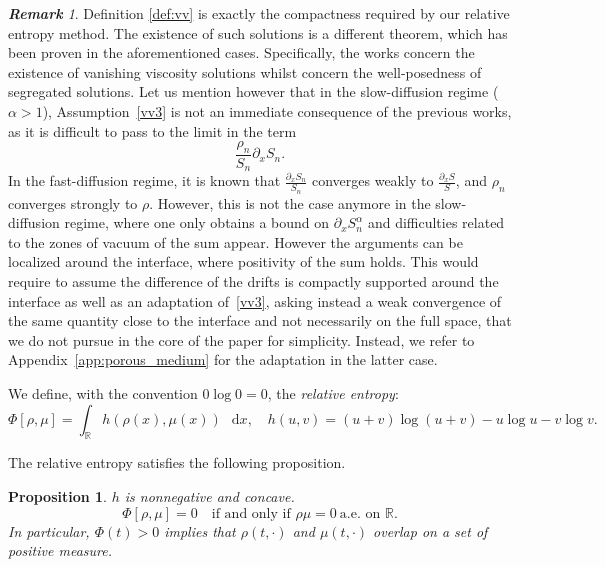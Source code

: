 \documentclass[a4paper,twosided, 11pt]{article}
\newcommand{\R}{\mathbb{R}}
\theoremstyle{plain}
\newtheorem{proposition}[thm]{Proposition}
\theoremstyle{remark}
\newtheorem{remark}[thm]{\bf Remark}
\newcommand{\diff}{\mathop{} \mathrm{d}}
\numberwithin{equation}{section}
\begin{document}
\begin{remark}
Definition \ref{def:vv} is exactly the compactness required by our relative entropy method. 
The existence of such solutions is a different theorem, which has been proven in the aforementioned cases. 
Specifically, the works \cite{2025arXiv250418484M,ElbarSantambrogio25,MeszarosParker26,Skrzeczkowski2026crossdiffusion} concern the existence of vanishing viscosity solutions whilst \cite{MeszarosKim2018,santambrogioschulz2026segregated} concern the well-posedness of segregated solutions. Let us mention however that in the slow-diffusion regime ($\alpha>1$), Assumption~\ref{vv3} is not an immediate consequence of the previous works, as it is difficult to pass to the limit in the term
$$
\frac{\rho_n}{S_n}\partial_xS_n.
$$
In the fast-diffusion regime, it is known that $\frac{\partial_x S_n}{S_n}$ converges weakly to $\frac{\partial_x S}{S}$, and $\rho_n$ converges strongly to $\rho$. However, this is not the case anymore in the slow-diffusion regime, where one only obtains a bound on $\partial_x S_n^{\alpha}$ and difficulties related to the zones of vacuum of the sum appear. However the arguments can be localized around the interface, where positivity of the sum holds. This would require to assume the difference of the drifts is compactly supported around the interface as well as an adaptation of~\ref{vv3}, asking instead a weak convergence of the same quantity close to the interface and not necessarily on the full space, that we do not pursue in the core of the paper for simplicity. Instead, we refer to Appendix~\ref{app:porous_medium} for the adaptation in the latter case. 
\end{remark}





We define, with the convention $0\log0=0$,  the \textit{relative entropy}:
\begin{equation}\label{eq:relative_entropy}
\Phi[\rho,\mu] =\int_\R h(\rho(x),\mu(x))\,\diff x, \quad
h(u,v)=(u+v)\log(u+v)-u\log u-v\log v.
\end{equation}

The relative entropy satisfies the following proposition.

\begin{proposition}\label{prop:entropy_properties}
$h$ is nonnegative and concave. 
$$
\Phi[\rho,\mu]=0 \quad \text{if and only if }
\rho\mu=0\ \text{a.e. on }\R.
$$
In particular, $\Phi(t)>0$ implies that $\rho(t,\cdot)$ and $\mu(t,\cdot)$ overlap on a set of positive measure. 
\end{proposition}
\end{document}
